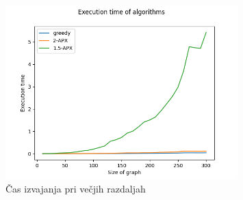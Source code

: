 \documentclass{article}
\begin{document}
\begin{figure}
	\centering
	\includegraphics[width = 0.8\textwidth]{figs/time1000.png}
	\caption{Čas izvajanja pri večjih razdaljah}
	\label{fig:time1000}
\end{figure}
\end{document}
